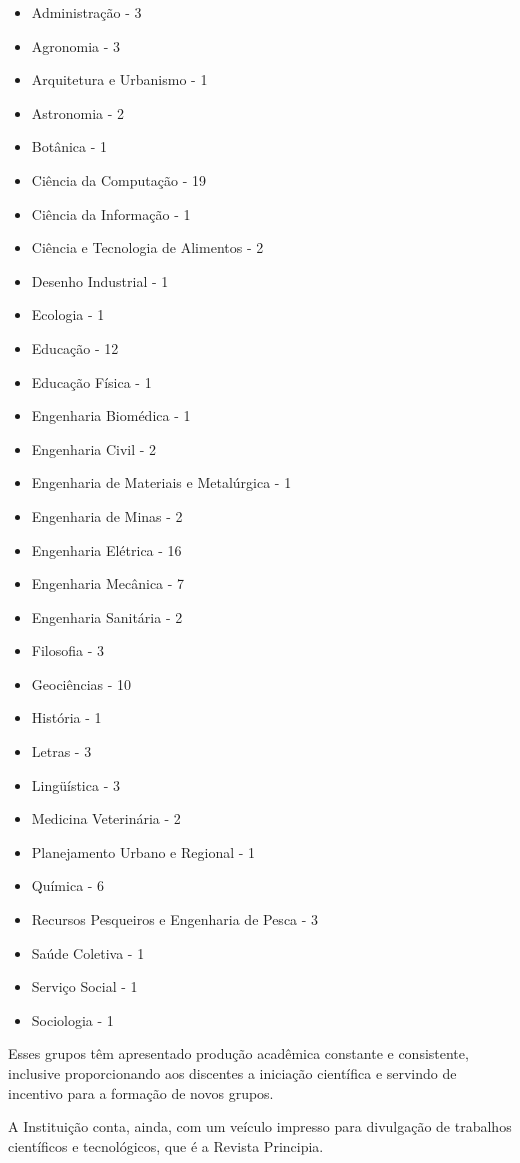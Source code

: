 	\begin{itemize}
		\item Administração - 3
		\item Agronomia	- 3
		\item Arquitetura e Urbanismo - 1
		\item Astronomia - 2
		\item Botânica - 1
		\item Ciência da Computação - 19
		\item Ciência da Informação - 1
		\item Ciência e Tecnologia de Alimentos - 2
		\item Desenho Industrial - 1
		\item Ecologia - 1
		\item Educação - 12
		\item Educação Física - 1
		\item Engenharia Biomédica - 1
		\item Engenharia Civil - 2
		\item Engenharia de Materiais e Metalúrgica - 1
		\item Engenharia de Minas - 2
		\item Engenharia Elétrica - 16
		\item Engenharia Mecânica - 7
		\item Engenharia Sanitária - 2
		\item Filosofia - 3
		\item Geociências - 10
		\item História - 1
		\item Letras - 3
		\item Lingüística - 3
		\item Medicina Veterinária - 2
		\item Planejamento Urbano e Regional - 1
		\item Química - 6
		\item Recursos Pesqueiros e Engenharia de Pesca - 3
		\item Saúde Coletiva - 1
		\item Serviço Social - 1
		\item Sociologia - 1
	\end{itemize}

	Esses grupos têm apresentado produção acadêmica constante e consistente, inclusive proporcionando aos discentes a iniciação científica e servindo de incentivo para a formação de novos grupos.
	
	A Instituição conta, ainda, com um veículo impresso para divulgação de trabalhos científicos e tecnológicos, que é a Revista Principia.
	
